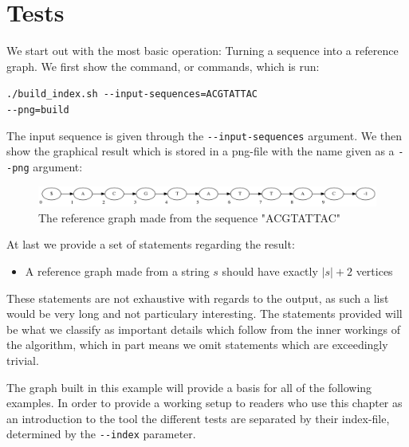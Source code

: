 \documentclass[thesis.tex]{subfiles}
\begin{document}
\section{Tests}
We start out with the most basic operation: Turning a sequence into a reference graph. We first show the command, or commands, which is run:\\
\par\noindent
\texttt{./build\_index.sh -{}-input-sequences=ACGTATTAC\\
-{}-png=build}\\
\par\noindent
The input sequence is given through the \texttt{-{}-input-sequences} argument. We then show the graphical result which is stored in a png-file with the name given as a \texttt{-{}-png} argument:\\
\begin{figure}[!h]
  \begin{mdframed}
    \includegraphics[width=\textwidth]{output/build.png} 
  \end{mdframed}
  \caption{The reference graph made from the sequence "ACGTATTAC"}
  \label{fig:validation_ref}
\end{figure}
\par\noindent
At last we provide a set of statements regarding the result:
\begin{itemize}
\item A reference graph made from a string $s$ should have exactly $|s|+2$ vertices
\end{itemize}
These statements are not exhaustive with regards to the output, as such a list would be very long and not particulary interesting. The statements provided will be what we classify as important details which follow from the inner workings of the algorithm, which in part means we omit statements which are exceedingly trivial.\\
\par\noindent
The graph built in this example will provide a basis for all of the following examples. In order to provide a working setup to readers who use this chapter as an introduction to the tool the different tests are separated by their index-file, determined by the \texttt{-{}-index} parameter.
\end{document}
